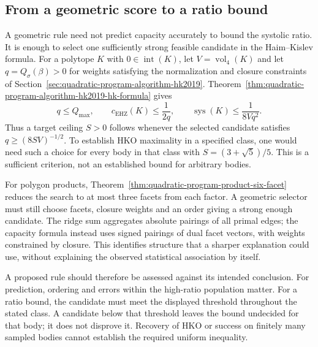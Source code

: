 \subsection{From a geometric score to a ratio bound}
\label{subsec:ds-geometric-witness}

A geometric rule need not predict capacity accurately to bound the systolic
ratio. It is enough to select one sufficiently strong feasible candidate in
the Haim--Kislev formula. For a polytope $K$ with
$0\in\operatorname{int}(K)$, let $V=\operatorname{vol}_4(K)$ and let
$q=Q_\sigma(\beta)>0$ for weights satisfying the normalization and closure
constraints of Section~\ref{sec:quadratic-program-algorithm-hk2019}.
Theorem~\ref{thm:quadratic-program-algorithm-hk2019-hk-formula} gives
\[
 q\leq Q_{\max},\qquad
 c_{\mathrm{EHZ}}(K)\leq\frac1{2q},\qquad
 \operatorname{sys}(K)\leq\frac1{8Vq^2}.
\]
Thus a target ceiling $S>0$ follows whenever the selected candidate satisfies
$q\geq(8SV)^{-1/2}$. To establish HKO maximality in a specified class,
one would need such a choice for every body in that class with
$S=(3+\sqrt5)/5$. This is a sufficient criterion, not an established
bound for arbitrary bodies.

For polygon products, Theorem~\ref{thm:quadratic-program-product-six-facet}
reduces the search to at most three facets from each factor. A geometric selector
must still choose facets, closure weights and an order giving a strong
enough candidate. The ridge sum aggregates absolute pairings of all primal
edges; the capacity formula instead uses signed pairings of dual facet
vectors, with weights constrained by closure. This identifies structure
that a sharper explanation could use, without explaining the observed
statistical association by itself.

A proposed rule should therefore be assessed against its intended conclusion.
For prediction, ordering and errors within the high-ratio population matter.
For a ratio bound, the candidate must meet the displayed threshold throughout
the stated class. A candidate below that threshold leaves the bound undecided
for that body; it does not disprove it. Recovery of HKO or success on finitely
many sampled bodies cannot establish the required uniform inequality.

